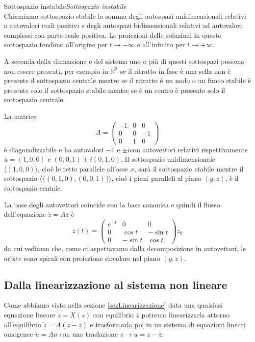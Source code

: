 \documentclass[11pt,a4paper,twoside]{book}
\newenvironment{definizione}[1][\empty]{\begin{Definizione}{
\ifx\empty#1\relax\else\mdseries\itshape#1\\\fi
}{}}{\end{Definizione}}
\newenvironment{esempio}[1][Esempio]{ 
  \begin{center}\begin{tcolorbox}[
  title={#1:\\},
  width=0.9\linewidth,
  flush right,
  enhanced jigsaw, 
  colback=white, 
  frame hidden, 
  sharpish corners, arc=3mm,
  borderline west = {1pt}{0pt}{gray},
  borderline south = {1pt}{0pt}{gray},
  coltitle=black, 
  fonttitle=\small\bfseries, 
  attach title to upper, 
  breakable,
  top=2.5pt, bottom=0.3pt]\small
  }{
 \normalsize \end{tcolorbox}\end{center}
}
\theoremstyle{esss}
\theoremstyle{dotless}
\numberwithin{equation}{section} %
\begin{document}
\begin{definizione}[Sottospazio instabile]
Chiamiamo sottospazio stabile la somma degli autospazi unidimensionali relativi a autovalori reali positivi e degli autospazi bidimensionali relativi ad autovalori complessi con parte reale positiva. Le proiezioni delle soluzioni in questo sottospazio tendono all'origine per $t\rightarrow -\infty$ e all'infinito per $t\rightarrow +\infty$.\\
\end{definizione}

A seconda della dimensione e del sistema uno o più di questi sottospazi possono non essere presenti, per esempio in $\mathbb{R}^2$ se il ritratto in fase è una sella non è presente il sottospazio centrale mentre se il ritratto è un nodo o un fuoco stabile è presente solo il sottospazio stabile mentre se è un centro è presente solo il sottospazio centrale.

\begin{esempio}
La matrice \[A=\left(\begin{array}{ccc} -1 & 0 &0 \\ 0 & 0 & -1 \\ 0 & 1 & 0 \end{array}\right)\] è diagonalizzabile e ha autovalori $-1$ e $\pm i$con autovettori relativi rispettivamente $u=(1,0,0)$ e $(0,0,1)\pm i (0,1,0)$.
Il sottospazio unidimensionale $\langle(1,0,0)\rangle$, cioè le rette parallele all'asse $x$, sarà il sottospazio stabile mentre il sottospazio $\langle \{(0,1,0),(0,0,1)\}\rangle$, cioè i piani paralleli al piano $(y,z)$, è il sottospazio centale.

La base degli autovettori coincide con la base canonica e quindi il flusso dell'equazione $\dot{z}=Az$ è
\[
z(t)=\left(\begin{array}{ccc}
e^{-t} & 0 & 0 \\
0 & \cos{t} & -\sin{t} \\
0 & -\sin{t} & \cos{t} 
\end{array}\right) z_0
\]
da cui vediamo che, come ci aspettavamo dalla decomposizione in autovettori, le orbite sono spirali con proiezione circolare nel piano $(y,z)$.
\end{esempio}



\subsection{Dalla linearizzazione al sistema non lineare}
Come abbiamo visto nella sezione \ref{sezLinearizzazione} data una qualsiasi equazione lineare $\dot{z}=X(z)$ con equilibrio $\overline{z}$ potremo linearizzarla attorno all'equilibrio $\dot{z}=A(z-\overline{z})$ e trasformarla poi in un sistema di equazioni lineari omogenee $\dot{u}=Au$ con una traslazione $z\rightarrow u=z-\overline{z}$.
\end{document}
